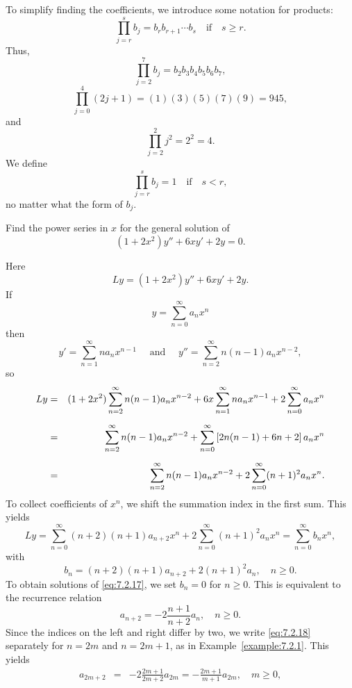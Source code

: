 To simplify finding the coefficients, we introduce some notation for products:
\[
  \prod^{s}_{j=r}b_{j}=b_{r}b_{r+1}\cdots b_{s}\quad\mbox{if}\quad s\ge r.
\]
Thus,
\[
  \prod^{7}_{j=2}b_{j}=b_{2}b_{3}b_{4}b_{5}b_{6}b_{7},
\]
\[
  \prod^{4}_{j=0}(2j+1)=(1)(3)(5)(7)(9)=945,
\]
and
\[
  \prod^{2}_{j=2}j^{2}=2^{2}=4.
\]
We define
\[
  \prod^{s}_{j=r}b_{j}=1\quad\mbox{if}\quad s<r,
\]
no matter what the form of $b_{j}$.

\begin{example}
  \label{example:7.2.2}\rm Find the power series in $x$ for the general solution of
  \begin{equation}
    \label{eq:7.2.17}(1+2x^{2})y''+6xy'+2y=0.
  \end{equation}
\end{example}

\begin{examplesolution}
\solution Here
\[
  Ly=(1+2x^{2})y''+6xy'+2y.
\]
If
\[
  y=\sum_{n=0}^{\infty}a_{n}x^{n}
\]
then
\[
  y'=\sum_{n=1}^{\infty}na_{n}x^{n-1}\quad\mbox{ and }\quad y''=\sum_{n=2}^{\infty}n(n-1)a_{n}x^{n-2},
\]
so
\begin{eqnarray*}
  Ly & = & (1+2x^{2})\sum^{\infty}_{n=2}n(n-1)a_{n}x^{n-2}+6x\sum^{\infty}_{n=1}na_{n}x^{n-1}+2\sum^{\infty}_{n=0}a_{n}x^{n} \\[2\jot]
     & = & \sum_{n=2}^{\infty}n(n-1)a_{n}x^{n-2}+\sum_{n=0}^{\infty}\left[2n(n-1)+6n+2\right]a_{n}x^{n}                      \\[2\jot]
     & = & \sum_{n=2}^{\infty}n(n-1)a_{n}x^{n-2}+2\sum_{n=0}^{\infty}(n+1)^{2}a_{n}x^{n}.
\end{eqnarray*}
To collect coefficients of $x^{n}$, we shift the summation index in the first sum. This yields
\[
  Ly=\sum_{n=0}^{\infty}(n+2)(n+1)a_{n+2}x^{n}+2\sum_{n=0}^{\infty}(n+1)^{2}a_{n}x^{n}=\sum_{n=0}^{\infty}b_{n}x^{n},
\]
with
\[
  b_{n}=(n+2)(n+1)a_{n+2}+2(n+1)^{2}a_{n},\quad n\ge0.
\]
To obtain solutions of \eqref{eq:7.2.17}, we set $b_{n}=0$ for $n\ge0$. This is equivalent to the
recurrence relation
\begin{equation}
  \label{eq:7.2.18}a_{n+2}=-2{\frac{n+1}{n+2}}a_{n},\quad n\ge0.
\end{equation}
Since the indices on the left and right differ by two, we write \eqref{eq:7.2.18} separately for
$n=2m$ and $n=2m+1$, as in Example~\ref{example:7.2.1}. This yields
\begin{eqnarray}
  a_{2m+2}                                     & = & -2{\frac{2m+1}{2m+2}}a_{2m}=-\frac{2m+1}{m+1}a_{2m},\quad m\ge0,\label{eq:7.2.19} \\

\end{eqnarray}
\end{examplesolution}
